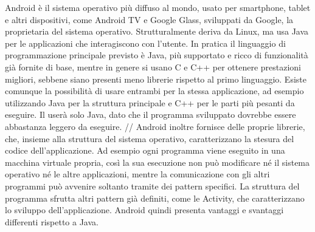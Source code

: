	Android è il sistema operativo più diffuso al mondo, usato per smartphone, tablet e altri dispositivi, come Android TV e Google Glass, sviluppati da Google, la proprietaria del sistema operativo. Strutturalmente deriva da Linux, ma usa Java per le applicazioni che interagiscono con l'utente. In pratica il linguaggio di programmazione principale previsto è Java, più supportato e ricco di funzionalità già fornite di base, mentre in genere si usano C e C++ per ottenere prestazioni migliori, sebbene siano presenti meno librerie rispetto al primo linguaggio. Esiste comunque la possibilità di usare entrambi per la stessa applicazione, ad esempio utilizzando Java per la struttura principale e C++ per le parti più pesanti da eseguire. Il  userà solo Java, dato che il programma sviluppato dovrebbe essere abbastanza leggero da eseguire. //
	Android inoltre fornisce delle proprie librerie, che, insieme alla struttura del sistema operativo, caratterizzano la stesura del codice dell'applicazione. Ad esempio ogni programma viene eseguito in una macchina virtuale propria, così la sua esecuzione non può modificare né il sistema operativo né le altre applicazioni, mentre la comunicazione con gli altri programmi può avvenire soltanto tramite dei pattern specifici. La struttura del programma sfrutta altri pattern già definiti, come le Activity, che caratterizzano lo sviluppo dell'applicazione. Android quindi presenta vantaggi e svantaggi differenti rispetto a Java.
	
